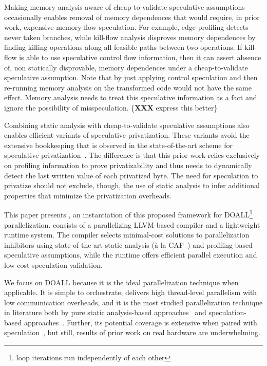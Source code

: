 Making memory analysis aware of cheap-to-validate speculative
assumptions occasionally enables removal of memory dependences that
would require, in prior work, expensive memory flow speculation.
%
For example, edge profiling detects never taken branches, while
kill-flow analysis disproves memory dependences by finding killing
operations along all feasible paths between two operations. If
kill-flow is able to use speculative control flow information, then it
can assert absence of, non statically disprovable, memory dependences
under a cheap-to-validate speculative assumption.
Note that by just applying control speculation and then re-running
memory analysis on the transformed code would not have the same
effect.  Memory analysis needs to treat this speculative information
as a fact and ignore the possibility of misspeculation.
\{\textbf{XXX} express this better\}

Combining static analysis with cheap-to-validate speculative
assumptions also enables efficient variants of speculative
privatization.
%
These variants avoid the extensive bookkeeping that is observed in the
state-of-the-art scheme for speculative privatization~\cite{johnson:12:pldi}.
%
The difference is that this prior work relies exclusively on profiling
information to prove privatizability and thus needs to dynamically
detect the last written value of each privatized byte.
%
The need for speculation to privatize should not exclude, though, the
use of static analysis to infer additional properties that minimize
the privatization overheads.

This paper presents \name, an instantiation of this proposed framework
for DOALL\footnote{loop iterations run independently of each other}
parallelization. \name consists of a parallelizing LLVM-based compiler
and a lightweight
runtime system. The compiler selects minimal-cost solutions to
parallelization inhibitors using state-of-the-art static analysis
(\`{a} la CAF~\cite{johnson:cgo:17}) and profiling-based speculative
assumptions, while the runtime offers efficient parallel execution and
low-cost speculation validation.

We focus on DOALL because it is the ideal parallelization technique
when applicable. It is simple to orchestrate, delivers high
thread-level parallelism with low communication overheads, and it is
the most studied parallelization technique in literature both by pure
static analysis-based approaches~\cite{..,.,..} and speculation-based
approaches~\cite{..,..,..,..}.  Further, its potential coverage is
extensive when paired with speculation~\cite{zhong:08:hpca}, but still,
results of prior work on real hardware are underwhelming.

